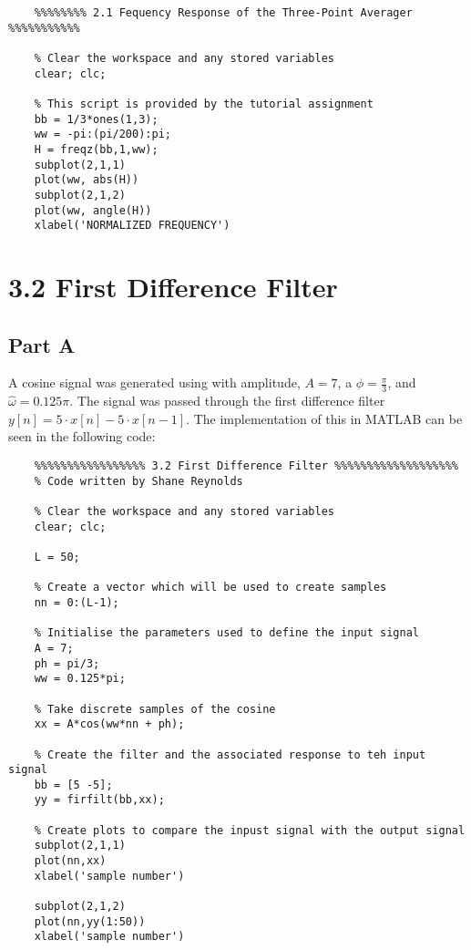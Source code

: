 \documentclass{article}
\begin{document}
\begin{lstlisting}
	%%%%%%%% 2.1 Fequency Response of the Three-Point Averager %%%%%%%%%%%
	
	% Clear the workspace and any stored variables
	clear; clc;
	
	% This script is provided by the tutorial assignment
	bb = 1/3*ones(1,3);
	ww = -pi:(pi/200):pi;
	H = freqz(bb,1,ww);
	subplot(2,1,1)
	plot(ww, abs(H))
	subplot(2,1,2)
	plot(ww, angle(H))
	xlabel('NORMALIZED FREQUENCY')
\end{lstlisting}

\section{3.2 First Difference Filter}

\subsection{Part A}
A cosine signal was generated using with amplitude, $A = 7$, a $\phi = \frac{\pi}{3}$, and $\hat{\omega} = 0.125 \pi$. The signal was passed through the first difference filter $y[n] = 5 \cdot x[n] - 5 \cdot x[n-1]$. The implementation of this in MATLAB can be seen in the following code:

\begin{lstlisting}
	%%%%%%%%%%%%%%%%% 3.2 First Difference Filter %%%%%%%%%%%%%%%%%%%
	% Code written by Shane Reynolds
	
	% Clear the workspace and any stored variables
	clear; clc;
	
	L = 50;
	
	% Create a vector which will be used to create samples
	nn = 0:(L-1);
	
	% Initialise the parameters used to define the input signal
	A = 7;
	ph = pi/3;
	ww = 0.125*pi;
	
	% Take discrete samples of the cosine
	xx = A*cos(ww*nn + ph);
	
	% Create the filter and the associated response to teh input signal
	bb = [5 -5];
	yy = firfilt(bb,xx);
	
	% Create plots to compare the inpust signal with the output signal
	subplot(2,1,1)
	plot(nn,xx)
	xlabel('sample number')
	
	subplot(2,1,2)
	plot(nn,yy(1:50))
	xlabel('sample number')
\end{lstlisting}
\end{document}
